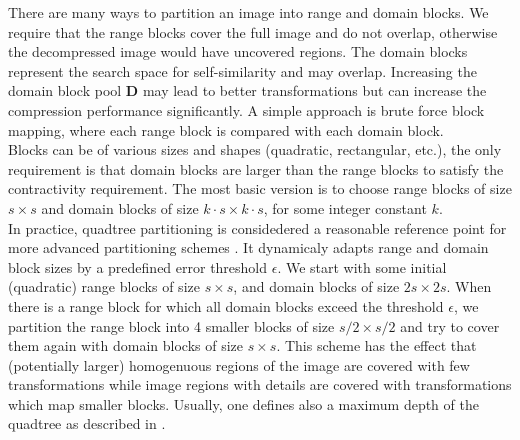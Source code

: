 There are many ways to partition an image into range and domain blocks. We require that the range blocks cover the full image and do not overlap, otherwise the
decompressed image would have uncovered regions. The domain blocks represent the search space for self-similarity and may overlap. 
Increasing the domain block pool $\boldsymbol{D}$ may lead to better transformations but can increase the compression performance significantly.
A simple approach is brute force block mapping, where each range block is compared with each domain block.\\
Blocks can be of various sizes and shapes (quadratic, rectangular, etc.), the only requirement is that domain blocks are larger than the range blocks to satisfy the
contractivity requirement. The most basic version is to choose range blocks of size $s \times s$ and domain blocks of size $k\cdot s \times k \cdot s$, for some
integer constant $k$.\\
In practice, quadtree partitioning is considedered a reasonable reference point for more advanced partitioning schemes \cite{fisher2012}. 
It dynamicaly adapts range and domain block sizes by a predefined error threshold $\epsilon$. 
We start with some initial (quadratic) range blocks of size $s \times s$, and domain blocks of size $2s \times 2s$. 
When there is a range block for which all domain blocks exceed the threshold $\epsilon$, we partition
the range block into 4 smaller blocks of size $s/2 \times s/2$ and try to cover them again with domain blocks of size $s \times s$.
This scheme has the effect that (potentially larger) homogenuous regions of the image are covered with few transformations while image
regions with details are covered with transformations which map smaller blocks. 
Usually, one defines also a maximum depth of the quadtree as described in \cite{fisher2012}.

